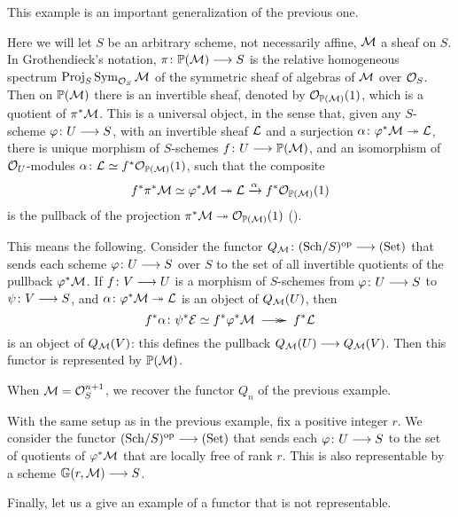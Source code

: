 \begin{2   CONTRAVARIANT FUNCTORS}
\begin{2.1 Yoneda Lemma}
\begin{example}
This example is an important generalization of the previous one.

Here we will let $S$ be an arbitrary scheme, not necessarily affine, $\mathcal{M}$ a \qc sheaf on $S$. In Grothendieck's notation, $\pi\colon \PP(\cM) \arr S$ is the relative homogeneous spectrum $\operatorname{Proj}_{S}\operatorname{Sym}_{\mathcal{O}_{S}} \mathcal{M}$ of the symmetric sheaf of algebras of $\mathcal{M}$ over $\mathcal{O}_{S}$. Then on $\mathbb{P}(\mathcal{M})$ there is an invertible sheaf, denoted by $\mathcal{O}_{\mathbb{P}(\mathcal{M})}(1)$, which is a quotient of $\pi^{*}\mathcal{M}$. This is a universal object, in the sense that, given any $S$-scheme $\phi\colon U \arr S$, with an invertible sheaf $\mathcal{L}$ and a surjection $\alpha\colon \varphi^{*}\mathcal{M} \twoheadrightarrow \mathcal{L}$, there is unique morphism of $S$-schemes $f\colon U \arr \PP(\cM)$, and an isomorphism of $\mathcal{O}_{U}$-modules $\alpha\colon \mathcal{L} \simeq f^{*}\mathcal{O}_{\mathbb{P}(\mathcal{M})}(1)$, such that the composite
   \[
   f^{*}\pi^{*}\mathcal{M} \simeq \varphi^{*}\mathcal{M} \twoheadrightarrow \mathcal{L}
      \xrightarrow{\alpha} f^{*}\mathcal{O}_{\mathbb{P}(\mathcal{M})}(1)
   \]
is the pullback of the projection $\pi^{*}\mathcal{M} \twoheadrightarrow \mathcal{O}_{\mathbb{P}(\mathcal{M})}(1)$ (\cite[Proposition~4.2.3]{ega1}).

This means the following. Consider the functor $Q_{\cM} \colon \catsch{S}\op \arr \catset$ that sends each scheme $\phi \colon U \arr S$ over $S$ to the set of all invertible quotients of the pullback $\varphi^*\mathcal{M}$. If $f\colon V \arr U$ is a morphism of $S$-schemes from $\phi\colon U \arr S$ to $\psi \colon V \arr S$, and $\alpha\colon \varphi^* \mathcal{M} \twoheadrightarrow \mathcal{L}$ is an object of $Q_{\mathcal{M}}(U)$, then
   \[
   f^*\alpha \colon \psi^* \cE \simeq f^*\phi^* \cM
   \xymatrix@C-5pt{{}\ar@{->>}[r]&{}} f^* \cL
   \]
is an object of $Q_{\mathcal{M}}(V)$: this defines the pullback $Q_{\cM}(U) \arr Q_{\cM}(V)$. Then this functor is represented by $\mathbb{P}(\mathcal{M})$.

When $\mathcal{M} = \mathcal{O}_{S}^{n+1}$, we recover the functor $Q_{n}$ of the previous example.
\end{example}

\begin{example}\label{ex:grassmanians}
With the same setup  as in the previous example, fix a positive integer $r$. We consider the functor $\catsch{S}\op \arr \catset$ that sends each $\phi \colon U \arr S$ to the set of quotients of $\varphi^{*}\mathcal{M}$ that are locally free of rank $r$. This is also representable by a scheme $\GG(r,\cM) \arr S$.
\end{example}


Finally, let us a give an example of a functor that is not representable.


\end{2.1 Yoneda Lemma}
\end{2   CONTRAVARIANT FUNCTORS}
